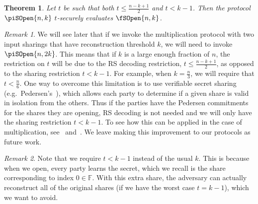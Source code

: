 \documentclass{article}
\newtheorem{theorem}{Theorem}
\theoremstyle{remark}
\newtheorem{remark}{Remark}
\newcommand{\F}{\mathbb{F}}
\begin{document}
\begin{theorem}\label{thm:so}
	Let $t$ be such that both $t \le \frac{n - k + 1}{2}$ and $t < k - 1$. Then
	the protocol $\piSOpen{n,k}$ $t$-securely evaluates $\fSOpen{n,k}$.
\end{theorem}

\begin{remark}
	We will see later that if we invoke the multiplication protocol with two
	input sharings that have reconstruction threshold $k$, we will need to
	invoke $\piSOpen{n,2k}$. This means that if $k$ is a large enough fraction
	of $n$, the restriction on $t$ will be due to the RS decoding restriction,
	$t \le \frac{n - k + 1}{2}$, as opposed to the sharing restriction $t < k -
	1$. For example, when $k = \frac{n}{3}$, we will require that $t <
	\frac{n}{6}$. One way to overcome this limitation is to use verifiable
	secret sharing (e.g.\ Pedersen's~\cite{p91a}), which allows each party to
	determine if a given share is valid in isolation from the others. Thus if
	the parties have the Pedersen commitments for the shares they are opening,
	RS decoding is not needed and we will only have the sharing restriction $t
	< k - 1$. To see how this can be applied in the case of multiplication,
	see~\cite{gjkr96} and~\cite{cmi93}. We leave making this improvement to our
	protocols as future work.
\end{remark}

\begin{remark}
	Note that we require $t < k - 1$ instead of the usual $k$. This is because
	when we open, every party learns the secret, which we recall is the share
	corresponding to index $0 \in \F$. With this extra share, the adversary can
	actually reconstruct all of the original shares (if we have the worst case
	$t = k - 1$), which we want to avoid.
\end{remark}
\end{document}
